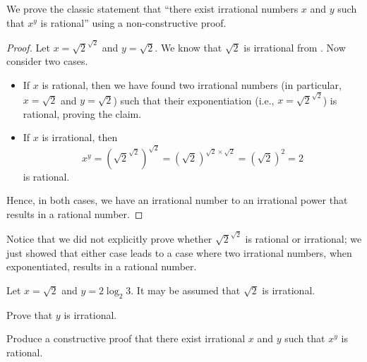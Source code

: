 \begin{example}
    We prove the classic statement that ``there exist irrational numbers $x$ and $y$ such that $x^y$ is rational'' using a non-constructive proof.
    \begin{proof}
        Let $x = \sqrt2^{\sqrt2}$ and $y = \sqrt2$. We know that $\sqrt2$ is irrational from . Now consider two cases.
        \begin{itemize}
            \item If $x$ is rational, then we have found two irrational numbers (in particular, $x = \sqrt 2$ and $y = \sqrt 2$) such that their exponentiation (i.e.,  $x = \sqrt2^{\sqrt2}$) is rational, proving the claim.
            \item If $x$ is irrational, then \[x^y = \left(\sqrt2^{\sqrt2}\right)^{\sqrt2} = (\sqrt2)^{\sqrt2 \times \sqrt2} = (\sqrt2)^2 = 2\]
            is rational.
        \end{itemize}
        Hence, in both cases, we have an irrational number to an irrational power that results in a rational number.
    \end{proof}

    Notice that we did not explicitly prove whether $\sqrt2^{\sqrt2}$ is rational or irrational; we just showed that either case leads to a case where two irrational numbers, when exponentiated, results in a rational number.
\end{example}

\begin{exercise}
    Let $x = \sqrt2$ and $y = 2\log_2{3}$. It may be assumed that $\sqrt2$ is irrational.
    \begin{partquestions}{\roman*}
        \item Prove that $y$ is irrational.
        \item Produce a constructive proof that there exist irrational $x$ and $y$ such that $x^y$ is rational.
    \end{partquestions}
\end{exercise}
